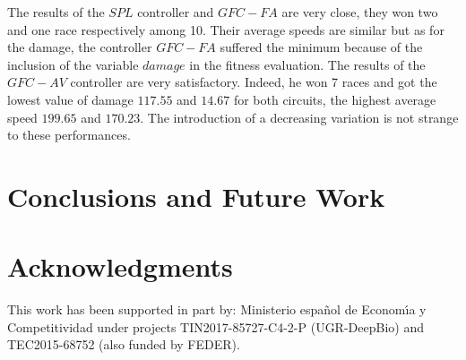\documentclass[conference]{IEEEtran}
\begin{document}
The results of the $SPL$ controller and $GFC-FA$ are very close, they won two and one race respectively among 10. Their average speeds are similar but as for the damage, the controller $GFC-FA$ suffered the minimum because of the inclusion of the variable $damage$ in the fitness evaluation.
The results of the $GFC-AV$ controller are very satisfactory. Indeed, he won 7 races and got the lowest value of damage $117.55$ and $14.67$ for both circuits, the highest average speed $199.65$ and $170.23$.
The introduction of a decreasing variation is not strange to these performances.




\section{Conclusions and Future Work} 
\label{sec:conclusions}



\section*{Acknowledgments}

This work has been supported in part by: Ministerio espa\~{n}ol de
Econom\'{\i}a y Competitividad under projects  TIN2017-85727-C4-2-P (UGR-DeepBio) and TEC2015-68752 (also funded by FEDER).



\end{document}
